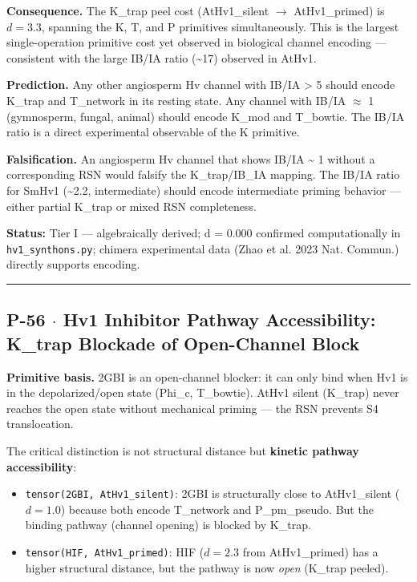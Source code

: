 \documentclass[12pt,a4paper]{article}
\begin{document}
\textbf{Consequence.} The K\_trap peel cost (AtHv1\_silent $\rightarrow$ AtHv1\_primed) is $d = 3.3$, spanning the K, T, and P primitives simultaneously. This is the largest single-operation primitive cost yet observed in biological channel encoding --- consistent with the large IB/IA ratio (\textasciitilde{}17) observed in AtHv1.

\textbf{Prediction.} Any other angiosperm Hv channel with IB/IA \textgreater{} 5 should encode K\_trap and T\_network in its resting state. Any channel with IB/IA $\approx$ 1 (gymnosperm, fungal, animal) should encode K\_mod and T\_bowtie. The IB/IA ratio is a direct experimental observable of the K primitive.

\textbf{Falsification.} An angiosperm Hv channel that shows IB/IA \textasciitilde{} 1 without a corresponding RSN would falsify the K\_trap/IB\_IA mapping. The IB/IA ratio for SmHv1 (\textasciitilde{}2.2, intermediate) should encode intermediate priming behavior --- either partial K\_trap or mixed RSN completeness.

\textbf{Status:} Tier I --- algebraically derived; d = 0.000 confirmed computationally in \texttt{hv1\_synthons.py}; chimera experimental data (Zhao et al. 2023 Nat. Commun.) directly supports encoding.

\begin{center}
\rule{0.5\textwidth}{0.4pt}
\end{center}

\subsection{P-56 $\cdot$ Hv1 Inhibitor Pathway Accessibility: K\_trap Blockade of Open-Channel Block}

\textbf{Primitive basis.} 2GBI is an open-channel blocker: it can only bind when Hv1 is in the depolarized/open state (Phi\_c, T\_bowtie). AtHv1 silent (K\_trap) never reaches the open state without mechanical priming --- the RSN prevents S4 translocation.

The critical distinction is not structural distance but \textbf{kinetic pathway accessibility}:

\begin{itemize}
    \item \texttt{tensor(2GBI, AtHv1\_silent)}: 2GBI is structurally close to AtHv1\_silent ($d = 1.0$) because both encode T\_network and P\_pm\_pseudo. But the binding pathway (channel opening) is blocked by K\_trap.
    \item \texttt{tensor(HIF, AtHv1\_primed)}: HIF ($d = 2.3$ from AtHv1\_primed) has a higher structural distance, but the pathway is now \emph{open} (K\_trap peeled).
\end{itemize}
\end{document}
